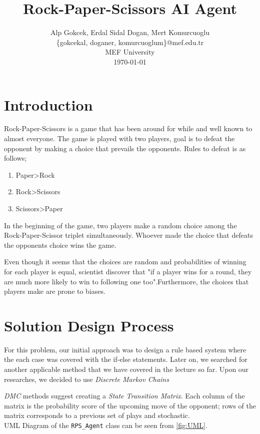 \documentclass{IEEEtran}
\author{Alp Gokcek, Erdal Sidal Dogan, Mert Komurcuoglu\\\{gokcekal, doganer, komurcuoglum\}@mef.edu.tr\\ MEF University \\ \today}
\title{Rock-Paper-Scissors AI Agent}
\begin{document}
	\maketitle
	\section{Introduction}
	
	Rock-Paper-Scissors is a game that has been around for while and well known to almost everyone. The game is played with two players, goal is to defeat the opponent by making a choice that prevails the opponents. Rules to defeat is as follows;
	
	\begin{enumerate}
		\item Paper\textgreater Rock
		\item Rock\textgreater Scissors	
		\item Scissors\textgreater Paper
	\end{enumerate}
	
	In the beginning of the game, two players make a random choice among the Rock-Paper-Scissor triplet simultaneously. Whoever made the choice that defeats the opponents choice wins the game.
	
	Even though it seems that the choices are random and probabilities of winning for each player is equal, scientist discover that "if a player wins for a round, they are much more likely to win to following one too".Furthermore, the choices that players make are prone to biases. \cite{winning-rps} 
	
	\section{Solution Design Process}
	
	For this problem, our initial approach was to design a rule based system where the each case was covered with the if-else statements. Later on, we searched for another applicable method that we have covered in the lecture so far. Upon our researches, we decided to use \textit{Discrete Markov Chains}
	
	\textit{DMC} methods suggest creating a \textit{State Transition Matrix}. Each column of the matrix is the probability score of the upcoming move of the opponent; rows of the matrix corresponds to a previous set of plays and stochastic. \\
	
	UML Diagram of the \texttt{RPS\_Agent} class can be seen from \ref{fig:UML}.
	
\end{document}
